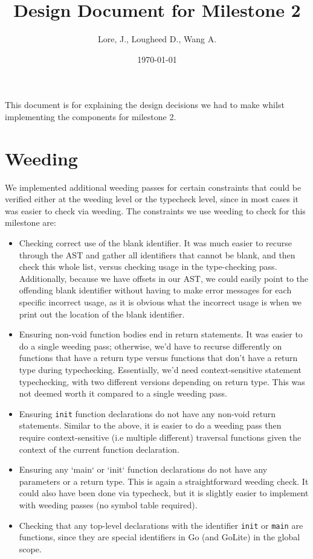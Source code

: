 \documentclass[11pt]{article}
\author{Lore, J., Lougheed D., Wang A.}
\date{\today}
\title{Design Document for Milestone 2}
\begin{document}
\maketitle
\tableofcontents

This document is for explaining the design decisions we had to make
whilst implementing the components for milestone 2.  \newpage
\section{Weeding}
\label{sec:orgea6003d}
We implemented additional weeding passes for certain constraints
that could be verified either at the weeding level or the typecheck
level, since in most cases it was easier to check via weeding. The
constraints we use weeding to check for this milestone are:
\begin{itemize}
\item Checking correct use of the blank identifier. It was much easier to recurse
through the AST and gather all identifiers that cannot be blank,
and then check this whole list, versus checking usage in the
type-checking pass. Additionally, because we have offsets in our
AST, we could easily point to the offending blank identifier
without having to make error messages for each specific incorrect
usage, as it is obvious what the incorrect usage is when we print
out the location of the blank identifier.
\item Ensuring non-void function bodies end in return statements. It was easier to
do a single weeding pass; otherwise, we'd have to recurse
differently on functions that have a return type versus functions
that don't have a return type during typechecking. Essentially,
we'd need context-sensitive statement typechecking, with two
different versions depending on return type. This was not deemed
worth it compared to a single weeding pass.
\item Ensuring \texttt{init} function declarations do not have any non-void return
statements. Similar to the above, it is easier to do a weeding
pass then require context-sensitive (i.e multiple different)
traversal functions given the context of the current function
declaration.
\item Ensuring any `main` or `init` function declarations do not have any
parameters or a return type. This is again a straightforward
weeding check.  It could also have been done via typecheck, but it
is slightly easier to implement with weeding passes (no symbol
table required).
\item Checking that any top-level declarations with the identifier \texttt{init} or
\texttt{main} are functions, since they are special identifiers in Go
(and GoLite) in the global scope.
\end{itemize}
\end{document}
